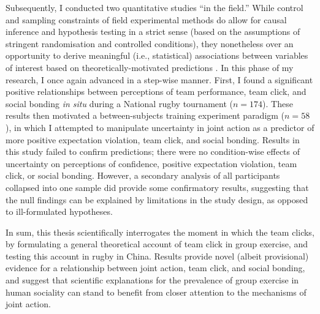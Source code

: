 \begin{CJK}{UTF8}{gbsn}
Subsequently, I conducted two quantitative studies ``in the field.''  While control and sampling constraints of field experimental methods do allow for causal inference and hypothesis testing in a strict sense (based on the assumptions of stringent randomisation and controlled conditions), they nonetheless over an opportunity to derive meaningful (i.e., statistical) associations between variables of interest based on theoretically-motivated predictions \citep{Xygalatas2013}.  In this phase of my research, I once again advanced in a step-wise manner.  First, I found a significant positive relationships between perceptions of team performance, team click, and social bonding \textit{in situ} during a National rugby tournament ($n = 174$).  These results then motivated a between-subjects training experiment paradigm ($n = 58$), in which I attempted to manipulate uncertainty in joint action as a predictor of more positive expectation violation, team click, and social bonding.  Results in this study failed to confirm predictions; there were no condition-wise effects of uncertainty on perceptions of confidence, positive expectation violation, team click, or social bonding.   However, a secondary analysis of all participants collapsed into one sample did provide some confirmatory results, suggesting that the null findings can be explained by limitations in the study design, as opposed to ill-formulated hypotheses.

In sum, this thesis scientifically interrogates the moment in which the team clicks, by formulating a general theoretical account of team click in group exercise, and testing this account in rugby in China.  Results provide novel (albeit provisional) evidence for a relationship between joint action, team click, and social bonding, and suggest that scientific explanations for the prevalence of group exercise in human sociality can stand to benefit from closer attention to the mechanisms of joint action.














\end{CJK}
